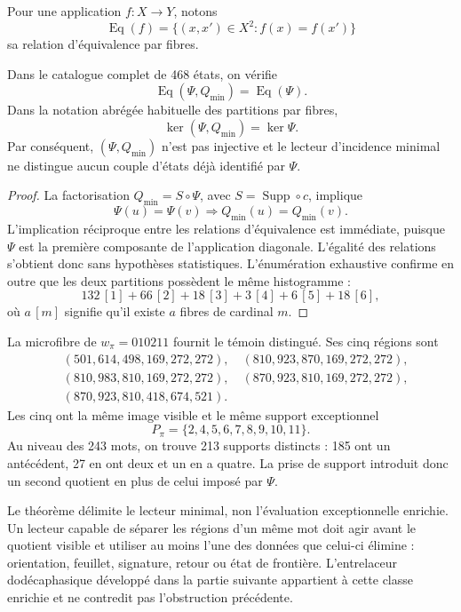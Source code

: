 Pour une application \(f:X\to Y\), notons
\[
 \operatorname{Eq}(f)=\{(x,x')\in X^2:f(x)=f(x')\}
\]
sa relation d'équivalence par fibres.

\begin{theorem}
\label{p12-83-c17-s4:thm:obstruccion-lector-excepcional-minimo}
Dans le catalogue complet de 468 états, on vérifie
\[
 \operatorname{Eq}(\Psi,Q_{\min})=\operatorname{Eq}(\Psi).
\]
Dans la notation abrégée habituelle des partitions par fibres,
\[
 \ker(\Psi,Q_{\min})=\ker\Psi.
\]
Par conséquent, \((\Psi,Q_{\min})\) n'est pas injective et le lecteur
d'incidence minimal ne distingue aucun couple d'états déjà
identifié par \(\Psi\).
\end{theorem}

\begin{proof}
La factorisation \(Q_{\min}=S\circ\Psi\), avec
\(S=\operatorname{Supp}\circ c\), implique
\[
 \Psi(u)=\Psi(v)\Longrightarrow Q_{\min}(u)=Q_{\min}(v).
\]
L'implication réciproque entre les relations d'équivalence est immédiate,
puisque \(\Psi\) est la première composante de l'application diagonale.
L'égalité des relations s'obtient donc sans hypothèses statistiques.
L'énumération exhaustive confirme en outre que les deux partitions possèdent le
même histogramme :
\[
 132\,[1]+66\,[2]+18\,[3]+3\,[4]+6\,[5]+18\,[6],
\]
où \(a\,[m]\) signifie qu'il existe \(a\) fibres de cardinal \(m\).
\end{proof}

La microfibre de \(w_\pi=010211\) fournit le témoin distingué. Ses
cinq régions sont
\[
\begin{split}
 &(501,614,498,169,272,272),\quad
 (810,923,870,169,272,272),\\
 &(810,983,810,169,272,272),\quad
 (870,923,810,169,272,272),\\
 &(870,923,810,418,674,521).
\end{split}
\]
Les cinq ont la même image visible et le même support exceptionnel
\[
 P_\pi=\{2,4,5,6,7,8,9,10,11\}.
\]
Au niveau des 243 mots, on trouve 213 supports distincts : 185 ont
un antécédent, 27 en ont deux et un en a quatre. La prise de support introduit
donc un second quotient en plus de celui imposé par \(\Psi\).

Le théorème délimite le lecteur minimal, non l'évaluation exceptionnelle
enrichie. Un lecteur capable de séparer les régions d'un même mot
doit agir avant le quotient visible et utiliser au moins l'une des données
que celui-ci élimine : orientation, feuillet, signature, retour ou état de frontière.
L'entrelaceur dodécaphasique développé dans la partie suivante appartient à cette
classe enrichie et ne contredit pas l'obstruction précédente.

